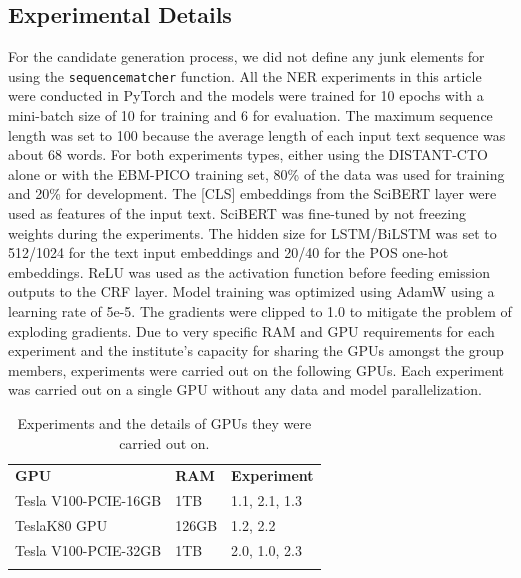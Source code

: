 \documentclass[11pt]{article}
\begin{document}
\subsection{Experimental Details}
\label{app:expdet}
%
For the candidate generation process, we did not define any junk elements for using the {\tt sequencematcher} function.
All the NER experiments in this article were conducted in PyTorch and the models were trained for 10 epochs with a mini-batch size of 10 for training and 6 for evaluation.
The maximum sequence length was set to 100 because the average length of each input text sequence was about 68 words.
For both experiments types, either using the DISTANT-CTO alone or with the EBM-PICO training set, 80\% of the data was used for training and 20\% for development.
The [CLS] embeddings from the SciBERT layer were used as features of the input text.
SciBERT was fine-tuned by not freezing weights during the experiments.
The hidden size for LSTM/BiLSTM was set to 512/1024 for the text input embeddings and 20/40 for the POS one-hot embeddings.
ReLU was used as the activation function before feeding emission outputs to the CRF layer.
Model training was optimized using AdamW using a learning rate of 5e-5.
The gradients were clipped to 1.0 to mitigate the problem of exploding gradients.
Due to very specific RAM and GPU requirements for each experiment and the institute's capacity for sharing the GPUs amongst the group members, experiments were carried out on the following GPUs.
Each experiment was carried out on a single GPU without any data and model parallelization.
%
%
\begin{table}[htp]
\centering
\begin{tabular}{l|l|l}
\Xhline{1pt}
\textbf{GPU} & \textbf{RAM} & \textbf{ Experiment }  \\
\Xhline{1pt}
Tesla V100-PCIE-16GB & 1TB  & 1.1, 2.1, 1.3\\
TeslaK80 GPU & 126GB & 1.2, 2.2\\
Tesla V100-PCIE-32GB & 1TB   & 2.0, 1.0, 2.3\\
\Xhline{1pt}
\end{tabular}
\caption{Experiments and the details of GPUs they were carried out on.}
\label{table:exp_gpu} 
\end{table}
%
%
%
\end{document}
